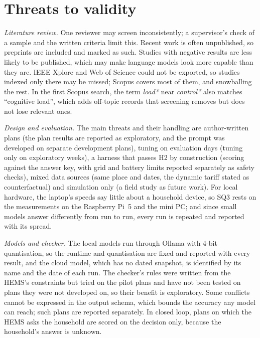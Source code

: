 \documentclass[12pt,a4paper]{report}
\begin{document}
\section{Threats to validity}
\label{sec:validity}

\textit{Literature review.} One reviewer may screen inconsistently; a
supervisor's check of a sample and the written criteria limit this.
Recent work is often unpublished, so preprints are included and marked
as such. Studies with negative results are less likely to be published,
which may make language models look more capable than they are. IEEE
Xplore and Web of Science could not be exported, so studies indexed only
there may be missed; Scopus covers most of them, and snowballing the
rest. In the first Scopus search, the term \textit{load*} near
\textit{control*} also matches ``cognitive load'', which adds
off-topic records that screening removes but does not lose relevant ones.

\textit{Design and evaluation.} The main threats and their handling are
author-written plans (the plan results are reported as exploratory, and
the prompt was developed on separate development plans), tuning on
evaluation days (tuning only on exploratory weeks), a harness that
passes H2 by construction (scoring against the answer key, with grid
and battery limits reported separately as safety checks), mixed data
sources (same place and dates, the dynamic tariff stated as
counterfactual) and simulation only (a field study as future work).
For local hardware, the laptop's speeds say little about a household
device, so SQ3 rests on the measurements on the Raspberry Pi~5 and the
mini PC; and since small models answer differently from run to run,
every run is repeated and reported with its spread.

\textit{Models and checker.} The local models run through Ollama with
4-bit quantisation, so the runtime and quantisation are fixed and
reported with every result, and the cloud model, which has no dated
snapshot, is identified by its name and the date of each run. The
checker's rules were written from the HEMS's constraints but tried on
the pilot plans and have not been tested on plans they were not
developed on, so their benefit is exploratory. Some conflicts cannot be expressed in the output schema,
which bounds the accuracy any model can reach; such plans are reported
separately. In closed loop, plans on which the HEMS asks the household
are scored on the decision only, because the household's answer is
unknown.

\end{document}

